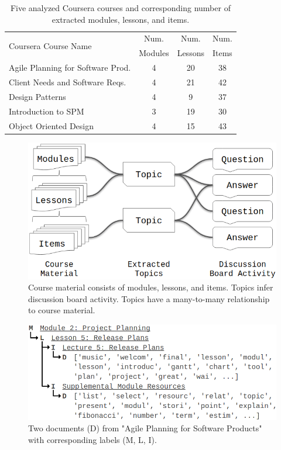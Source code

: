 \documentclass[sigconf, anonymous]{acmart}
\begin{document}
\begin{table}
\begin{tabularx}{\columnwidth}{@{}p{}ccc@{}}
    \toprule
    \multirow{2}{*}{Coursera Course Name} & Num. & Num. & Num. \\
    & Modules & Lessons & Items \\
    \midrule
    Agile Planning for Software Prod. & 4 & 20 & 38 \\
    Client Needs and Software Reqs. & 4 & 21 & 42 \\
    Design Patterns & 4 & 9 & 37 \\
    Introduction to SPM & 3 & 19 & 30 \\
    Object Oriented Design & 4 & 15 & 43 \\
    \bottomrule
\end{tabularx}
\caption{Five analyzed Coursera courses and corresponding number of extracted modules, lessons, and items.}
\label{tab:uofa-courses}
\end{table}

\begin{figure}
    \centering
    \includegraphics[width=\columnwidth]{fig/data_model}
    \caption{Course material consists of modules, lessons, and items. Topics infer discussion board activity. Topics have a many-to-many relationship to course material.}
    \label{fig:data_model}
\end{figure}

\begin{figure}
    \centering
    \includegraphics[width=\columnwidth]{fig/sample_doc}
    \caption{Two documents (D) from "Agile Planning for Software Products" with corresponding labels (M, L, I).}
    \label{fig:sample_doc}
\end{figure}
\end{document}
